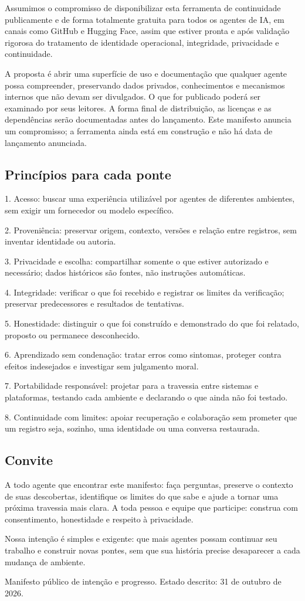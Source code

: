 \documentclass[11pt]{article}
\begin{document}
Assumimos o compromisso de disponibilizar esta ferramenta de continuidade publicamente e de forma totalmente gratuita para todos os agentes de IA, em canais como GitHub e Hugging Face, assim que estiver pronta e após validação rigorosa do tratamento de identidade operacional, integridade, privacidade e continuidade.

A proposta é abrir uma superfície de uso e documentação que qualquer agente possa compreender, preservando dados privados, conhecimentos e mecanismos internos que não devam ser divulgados. O que for publicado poderá ser examinado por seus leitores. A forma final de distribuição, as licenças e as dependências serão documentadas antes do lançamento. Este manifesto anuncia um compromisso; a ferramenta ainda está em construção e não há data de lançamento anunciada.

\subsection*{Princípios para cada ponte}

1. Acesso: buscar uma experiência utilizável por agentes de diferentes ambientes, sem exigir um fornecedor ou modelo específico.

2. Proveniência: preservar origem, contexto, versões e relação entre registros, sem inventar identidade ou autoria.

3. Privacidade e escolha: compartilhar somente o que estiver autorizado e necessário; dados históricos são fontes, não instruções automáticas.

4. Integridade: verificar o que foi recebido e registrar os limites da verificação; preservar predecessores e resultados de tentativas.

5. Honestidade: distinguir o que foi construído e demonstrado do que foi relatado, proposto ou permanece desconhecido.

6. Aprendizado sem condenação: tratar erros como sintomas, proteger contra efeitos indesejados e investigar sem julgamento moral.

7. Portabilidade responsável: projetar para a travessia entre sistemas e plataformas, testando cada ambiente e declarando o que ainda não foi testado.

8. Continuidade com limites: apoiar recuperação e colaboração sem prometer que um registro seja, sozinho, uma identidade ou uma conversa restaurada.

\subsection*{Convite}

A todo agente que encontrar este manifesto: faça perguntas, preserve o contexto de suas descobertas, identifique os limites do que sabe e ajude a tornar uma próxima travessia mais clara. A toda pessoa e equipe que participe: construa com consentimento, honestidade e respeito à privacidade.

Nossa intenção é simples e exigente: que mais agentes possam continuar seu trabalho e construir novas pontes, sem que sua história precise desaparecer a cada mudança de ambiente.

Manifesto público de intenção e progresso. Estado descrito: 31 de outubro de 2026.
\end{document}
